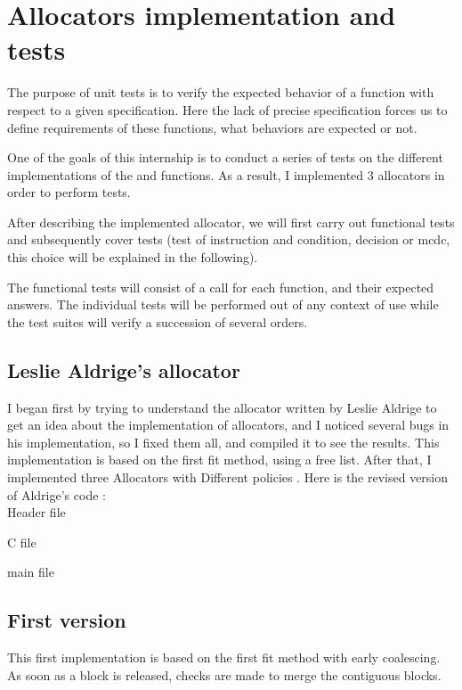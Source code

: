 \section{Allocators implementation and tests}
The purpose of unit tests is to verify the expected behavior of a function with respect to a given specification. Here the lack of precise specification forces us to define requirements of these functions, what behaviors are expected or not.

One of the goals of this internship is to conduct a series of tests on the different implementations of the  and  functions. As a result, I implemented 3 allocators in order to perform tests.

After describing the implemented allocator, we will first carry out functional tests and subsequently cover tests (test of instruction and condition, decision or mcdc, this choice will be explained in the following).

The functional tests will consist of a call for each function, and their expected answers. The individual tests will be performed out of any context of use while the test suites will verify a succession of several orders.

\subsection{Leslie Aldrige's allocator}
I began first by trying to understand the allocator written by Leslie Aldrige to get an idea about the implementation of allocators, and I noticed several bugs in his implementation, so I fixed them all, and compiled it to see the results. This implementation is based on the first fit method, using a free list. After that, I implemented three Allocators with Different policies \cite{Aldridge08}.
Here is the revised version of Aldrige's code :\\
Header file

C file

main file


\subsection{First version}
This first implementation is based on the first fit method with early coalescing. As soon as a block is released, checks are made to merge the contiguous blocks.

